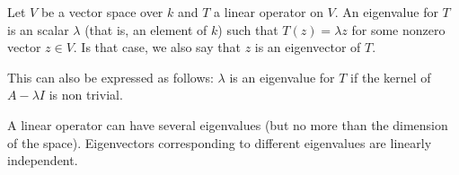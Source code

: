 \documentclass[12pt]{article}
\begin{document}
Let $V$ be a vector space over $k$ and $T$  a linear operator on $V$.
An eigenvalue for $T$ is an scalar $\lambda$ (that is, an element of $k$) such that
$T(z)=\lambda z$ for some nonzero vector $z\in V$.
Is that case, we also say that $z$ is an eigenvector of $T$.

This can also be expressed as follows: $\lambda$ is an eigenvalue for $T$ if the kernel of $A-\lambda I$ is non trivial.

A linear operator can have several eigenvalues (but no more than the dimension of the space). Eigenvectors corresponding to different eigenvalues are linearly independent.
\end{document}
